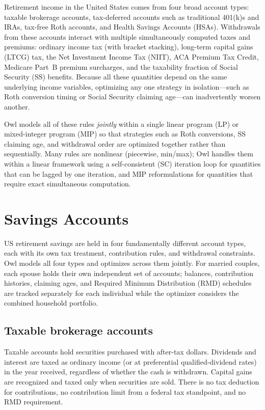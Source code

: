 \documentclass[fleqn,12pt]{report}
\begin{document}
Retirement income in the United States comes from four broad account types:
taxable brokerage accounts, tax-deferred accounts such as traditional 401(k)s
and IRAs, tax-free Roth accounts, and Health Savings Accounts (HSAs).
Withdrawals from these accounts interact with multiple simultaneously computed taxes
and premiums: ordinary income tax (with bracket stacking), long-term capital gains
(LTCG) tax, the Net Investment Income Tax (NIIT), ACA Premium Tax Credit, Medicare Part~B premium surcharges,
and the taxability fraction of Social Security (SS) benefits.
Because all these quantities depend on the same underlying income variables,
optimizing any one strategy in isolation---such as Roth conversion timing or
Social Security claiming age---can inadvertently worsen another.

Owl models all of these rules \emph{jointly} within a single linear program
(LP) or mixed-integer program (MIP) so that strategies such as Roth
conversions, SS claiming age, and withdrawal order are optimized together
rather than sequentially.
Many rules are nonlinear (piecewise, min/max); Owl handles them within a linear
framework using a self-consistent (SC) iteration loop for quantities that can
be lagged by one iteration, and MIP reformulations for quantities that require
exact simultaneous computation.

\section{Savings Accounts}

US retirement savings are held in four fundamentally different account types,
each with its own tax treatment, contribution rules, and withdrawal constraints.
Owl models all four types and optimizes across them jointly.
For married couples, each spouse holds their own independent set of accounts;
balances, contribution histories, claiming ages, and Required Minimum Distribution
(RMD) schedules are tracked
separately for each individual while the optimizer considers the combined
household portfolio.

\subsection*{Taxable brokerage accounts}

Taxable accounts hold securities purchased with after-tax dollars.
Dividends and interest are taxed as ordinary income (or at preferential
qualified-dividend rates) in the year received, regardless of whether the
cash is withdrawn.
Capital gains are recognized and taxed only when securities are sold.
There is no tax deduction for contributions, no contribution limit from a
federal tax standpoint, and no RMD requirement.
\end{document}
